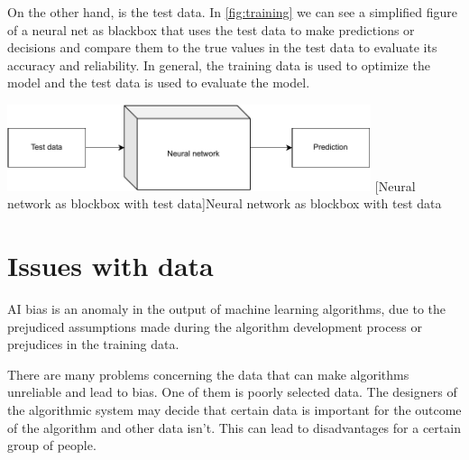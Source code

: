 \documentclass[
	12pt,
    a4paper,
    egregdoesnotlikesansseriftitles, %
    toc=chapterentrywithdots,
    oneside, openany,
    titlepage,
    parskip=half,
    headings=normal,  %
    listof=totoc,
    bibliography=totocnumbered,
    index=totoc,
    captions=tableheading,  %
    listof=flat,
    numbers=noenddot, %
    final]
    {scrbook}
\begin{document}
On the other hand, is the test data. 
In \ref{fig:training} we can see a simplified figure of a neural net as blackbox that uses the test data to make predictions or decisions and compare them to the true values in the test data to evaluate its accuracy and reliability. 
In general, the training data is used to optimize the model and the test data is used to evaluate the model. \cite[p. 32-33]{khan_guide_2018}



\vspace{1em}
\begin{minipage}{\linewidth}
	\centering
	\includegraphics[width=0.8\textwidth]{figures/test.pdf}
	[Neural network as blockbox with test data]{Neural network as blockbox with test data}
	\label{fig:test}
\end{minipage}



\chapter{Issues with data}
AI bias is an anomaly in the output of machine learning algorithms, due to the prejudiced assumptions made during the algorithm development process or prejudices in the training data.
 
There are many problems concerning the data that can make algorithms unreliable and lead to bias.
One of them is poorly selected data.
The designers of the algorithmic system may decide that certain data is important for the outcome of the algorithm and other data isn't.
This can lead to disadvantages for a certain group of people. \cite[p. 7]{usa}
\end{document}
